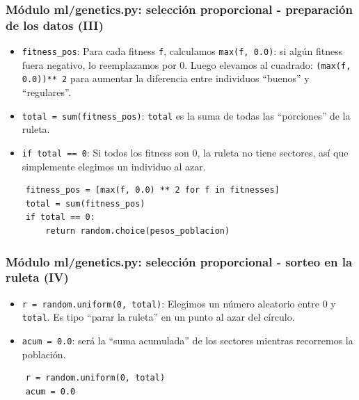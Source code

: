 \documentclass[
	11pt, %
]{beamer}
\begin{document}
\begin{frame}[fragile]
\frametitle{Módulo ml/genetics.py: selección proporcional - preparación de los datos (III)}

\begin{itemize}
    \item \texttt{fitness\_pos}:
        Para cada fitness \texttt{f}, calculamos \texttt{max(f, 0.0)}:
            si algún fitness fuera negativo, lo reemplazamos por 0.
        Luego elevamos al cuadrado: \texttt{(max(f, 0.0))** 2} para aumentar
            la diferencia entre individuos “buenos” y “regulares”.
    \item \texttt{total = sum(fitness\_pos)}: \texttt{total} es la suma de todas las “porciones” de la ruleta.
    \item \texttt{if total == 0}: Si todos los fitness son 0, la ruleta no tiene sectores,
        así que simplemente elegimos un individuo al azar.
\end{itemize}

{\scriptsize
\begin{verbatim}
    fitness_pos = [max(f, 0.0) ** 2 for f in fitnesses]
    total = sum(fitness_pos)
    if total == 0:
        return random.choice(pesos_poblacion)
\end{verbatim}
}

\end{frame}


\begin{frame}[fragile]
\frametitle{Módulo ml/genetics.py: selección proporcional - sorteo en la ruleta (IV)}

\begin{itemize}
    \item \texttt{r = random.uniform(0, total)}:
        Elegimos un número aleatorio entre 0 y \texttt{total}.
        Es tipo “parar la ruleta” en un punto al azar del círculo.

    \item \texttt{acum = 0.0}: será la “suma acumulada” de los sectores
              mientras recorremos la población.
\end{itemize}

{\scriptsize
\begin{verbatim}
    r = random.uniform(0, total)
    acum = 0.0
\end{verbatim}
}

\end{frame}
\end{document}
